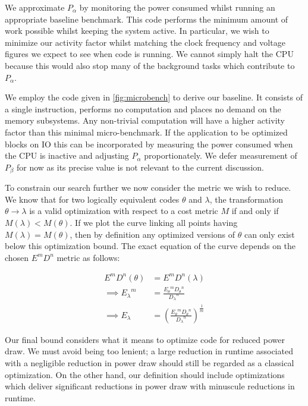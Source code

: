 We approximate $P_{\alpha}$ by monitoring the power consumed whilst running an appropriate baseline benchmark. This code performs the minimum amount of work possible whilst keeping the system active. In particular, we wish to minimize our activity factor whilst matching the clock frequency and voltage figures we expect to see when code is running. We cannot simply halt the CPU because this would also stop many of the background tasks which contribute to $P_{\alpha}$.

We employ the code given in \autoref{fig:microbench} to derive our baseline.  It consists of a single instruction, performs no computation and places no demand on the memory subsystems. Any non-trivial computation will have a higher activity factor than this minimal micro-benchmark. If the application to be optimized blocks on IO this can be incorporated by measuring the power consumed when the CPU is inactive and adjusting $P_\alpha$ proportionately. We defer measurement of $P_{\beta}$ for now as its precise value is not relevant to the current discussion. 

To constrain our search further we now consider the metric we wish to reduce. We know that for two logically equivalent codes $\theta$ and $\lambda$, the transformation $\theta \to \lambda$ is a valid optimization with respect to a cost metric $M$ if and only if $M(\lambda) < M(\theta)$. If we plot the curve linking all points having $M(\lambda) = M(\theta)$, then by definition any optimized versions of $\theta$ can only exist below this optimization bound. The exact equation of the curve depends on the chosen $E^mD^n$ metric as follows:

\begin{align}
E^mD^n(\theta) &= E^mD^n(\lambda) \nonumber \\
\implies {E_\lambda}^m &= \frac{{E_\theta}^m{D_\theta}^n}{{D_\lambda}^n} \nonumber \\
\implies E_\lambda &= (\frac{{E_\theta}^m{D_\theta}^n}{{D_\lambda}^n})^\frac{1}{m}
\end{align}

Our final bound considers what it means to optimize code for reduced power draw. We must avoid being too lenient; a large reduction in runtime associated with a negligible reduction in power draw should still be regarded as a classical optimization. On the other hand, our definition should include optimizations which deliver significant reductions in power draw with minuscule reductions in runtime. 

